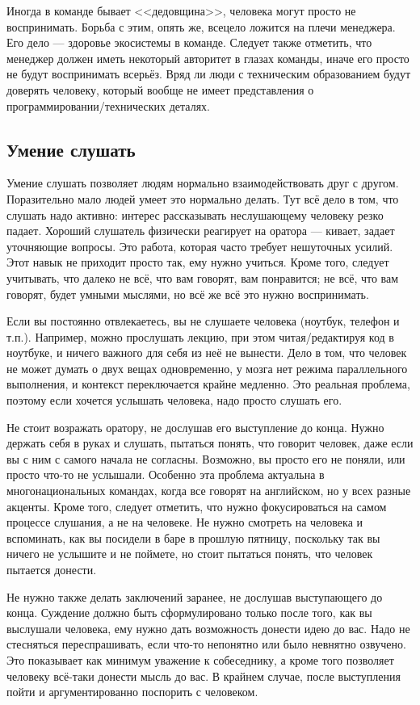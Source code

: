 \documentclass{../../text-style}
\begin{document}
Иногда в команде бывает <<дедовщина>>, человека могут просто не воспринимать. Борьба с этим, опять же, всецело ложится на плечи менеджера. Его дело --- здоровье экосистемы в команде. Следует также отметить, что менеджер должен иметь некоторый авторитет в глазах команды, иначе его просто не будут воспринимать всерьёз. Вряд ли люди с техническим образованием будут доверять человеку, который вообще не имеет представления о программировании/технических деталях.

\subsection{Умение слушать}

Умение слушать позволяет людям нормально взаимодействовать друг с другом. Поразительно мало людей умеет это нормально делать. Тут всё дело в том, что слушать надо активно: интерес рассказывать неслушающему человеку резко падает. Хороший слушатель физически реагирует на оратора --- кивает, задает уточняющие вопросы. Это работа, которая часто требует нешуточных усилий. Этот навык не приходит просто так, ему нужно учиться. Кроме того, следует учитывать, что далеко не всё, что вам говорят, вам понравится; не всё, что вам говорят, будет умными мыслями, но всё же всё это нужно воспринимать.

Если вы постоянно отвлекаетесь, вы не слушаете человека (ноутбук, телефон и т.п.). Например, можно прослушать лекцию, при этом читая/редактируя код в ноутбуке, и ничего важного для себя из неё не вынести. Дело в том, что человек не может думать о двух вещах одновременно, у мозга нет режима параллельного выполнения, и контекст переключается крайне медленно. Это реальная проблема, поэтому если хочется услышать человека, надо просто слушать его.

Не стоит возражать оратору, не дослушав его выступление до конца. Нужно держать себя в руках и слушать, пытаться понять, что говорит человек, даже если вы с ним с самого начала не согласны. Возможно, вы просто его не поняли, или просто что-то не услышали. Особенно эта проблема актуальна в многонациональных командах, когда все говорят на английском, но у всех разные акценты. Кроме того, следует отметить, что нужно фокусироваться на самом процессе слушания, а не на человеке. Не нужно смотреть на человека и вспоминать, как вы посидели в баре в прошлую пятницу, поскольку так вы ничего не услышите и не поймете, но стоит пытаться понять, что человек пытается донести.

Не нужно также делать заключений заранее, не дослушав выступающего до конца. Суждение должно быть сформулировано только после того, как вы выслушали человека, ему нужно дать возможность донести идею до вас. Надо не стесняться переспрашивать, если что-то непонятно или было невнятно озвучено. Это показывает как минимум уважение к собеседнику, а кроме того позволяет человеку всё-таки донести мысль до вас. В крайнем случае, после выступления пойти и аргументированно поспорить с человеком.
\end{document}
